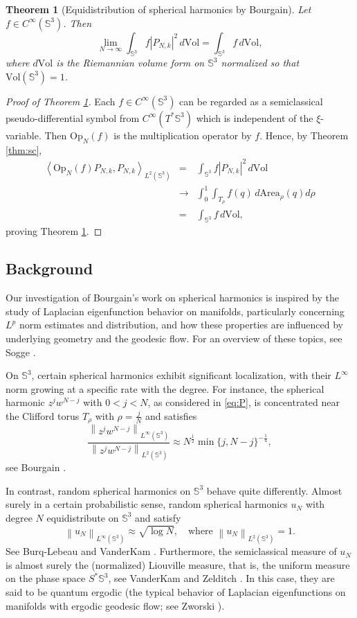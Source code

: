 \documentclass[12pt,reqno]{amsart}
\newcommand\Area{\mathrm{Area}}
\newcommand\Op{\mathrm{Op}}
\newcommand\Sb{\mathbb{S}}
\newcommand\Vol{\mathrm{Vol}}
\theoremstyle{plain}
\newtheorem{thm}{Theorem}
\theoremstyle{remark}
\numberwithin{equation}{section}
\begin{document}
\begin{thm}[Equidistribution of spherical harmonics by Bourgain]\label{thm:equid}
Let $f\in C^\infty(\Sb^3)$. Then
$$\lim_{N\to\infty}\int_{\Sb^3}f\left|P_{N,k}\right|^2\,d\Vol=\int_{\Sb^3}f\,d\Vol,$$
where $d\Vol$ is the Riemannian volume form on $\Sb^3$ normalized so that $\Vol(\Sb^3)=1$.
\end{thm}

\begin{proof}[Proof of Theorem \ref{thm:equid}]
Each $f\in C^\infty(\Sb^3)$ can be regarded as a semiclassical pseudo-differential symbol from $C^\infty(T^*\Sb^3)$ which is independent of the $\xi$-variable. Then $\Op_N(f)$ is the multiplication operator by $f$. Hence, by Theorem \ref{thm:sc},
\begin{eqnarray*}
\left\langle\Op_N(f)P_{N,k},P_{N,k}\right\rangle_{L^2(\Sb^3)}&=&\int_{\Sb^3}f\left|P_{N,k}\right|^2\,d\Vol\\
&\to&\int_0^1\int_{T_\rho}f(q)\,d\Area_\rho(q)d\rho\\
&=&\int_{\Sb^3}f\,d\Vol,
\end{eqnarray*}
proving Theorem \ref{thm:equid}.
\end{proof}

\subsection*{Background}
Our investigation of Bourgain's work on spherical harmonics \cite{B1} is inspired by the study of Laplacian eigenfunction behavior on manifolds, particularly concerning $L^p$ norm estimates and distribution, and how these properties are influenced by underlying geometry and the geodesic flow. For an overview of these topics, see Sogge \cite{So}.

On $\Sb^3$, certain spherical harmonics exhibit significant localization, with their $L^\infty$ norm growing at a specific rate with the degree. For instance, the spherical harmonic $z^j w^{N-j}$ with $0<j<N$, as considered in \eqref{eq:P}, is concentrated near the Clifford torus $T_\rho$ with $\rho = \frac{j}{N}$ and satisfies 
$$\frac{\left\|z^jw^{N-j}\right\|_{L^\infty(\Sb^3)}}{\left\|z^jw^{N-j}\right\|_{L^2(\Sb^3)}}\approx N^{\frac{1}{2}} \min\{j,N - j\}^{-\frac{1}{4}},$$
see Bourgain \cite[Equation (4)]{B1}.

In contrast, random spherical harmonics on $\Sb^3$ behave quite differently. Almost surely in a certain probabilistic sense, random spherical harmonics $u_N$ with degree $N$ equidistribute on $\Sb^3$ and satisfy 
$$\left\|u_N\right\|_{L^\infty(\Sb^3)}\approx\sqrt{\log N},\quad\text{where }\left\|u_N\right\|_{L^2(\Sb^3)}=1.$$
See Burq-Lebeau \cite{BL} and VanderKam \cite{V}. Furthermore, the semiclassical measure of $u_N$ is almost surely the (normalized) Liouville measure, that is, the uniform measure on the phase space $S^*\Sb^3$, see VanderKam \cite{V} and Zelditch \cite{Ze}. In this case, they are said to be quantum ergodic (the typical behavior of Laplacian eigenfunctions on manifolds with ergodic geodesic flow; see Zworski \cite[Chapter 15]{Zw}).
\end{document}

